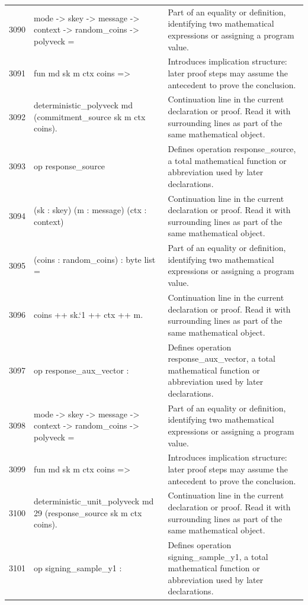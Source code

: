 \documentclass[10pt]{article}
\begin{document}
\begin{longtable}{r L{0.53\textwidth} L{0.37\textwidth}}
3090 & {\ttfamily\scriptsize   mode -> skey -> message -> context -> random\_coins -> polyveck =} & Part of an equality or definition, identifying two mathematical expressions or assigning a program value. \\
3091 & {\ttfamily\scriptsize   fun md sk m ctx coins =>} & Introduces implication structure: later proof steps may assume the antecedent to prove the conclusion. \\
3092 & {\ttfamily\scriptsize     deterministic\_polyveck md (commitment\_source sk m ctx coins).} & Continuation line in the current declaration or proof.  Read it with surrounding lines as part of the same mathematical object. \\
3093 & {\ttfamily\scriptsize op response\_source} & Defines operation response\_source, a total mathematical function or abbreviation used by later declarations. \\
3094 & {\ttfamily\scriptsize    (sk : skey) (m : message) (ctx : context)} & Continuation line in the current declaration or proof.  Read it with surrounding lines as part of the same mathematical object. \\
3095 & {\ttfamily\scriptsize    (coins : random\_coins) : byte list =} & Part of an equality or definition, identifying two mathematical expressions or assigning a program value. \\
3096 & {\ttfamily\scriptsize   coins ++ sk.`1 ++ ctx ++ m.} & Continuation line in the current declaration or proof.  Read it with surrounding lines as part of the same mathematical object. \\
3097 & {\ttfamily\scriptsize op response\_aux\_vector :} & Defines operation response\_aux\_vector, a total mathematical function or abbreviation used by later declarations. \\
3098 & {\ttfamily\scriptsize   mode -> skey -> message -> context -> random\_coins -> polyveck =} & Part of an equality or definition, identifying two mathematical expressions or assigning a program value. \\
3099 & {\ttfamily\scriptsize   fun md sk m ctx coins =>} & Introduces implication structure: later proof steps may assume the antecedent to prove the conclusion. \\
3100 & {\ttfamily\scriptsize     deterministic\_unit\_polyveck md 29 (response\_source sk m ctx coins).} & Continuation line in the current declaration or proof.  Read it with surrounding lines as part of the same mathematical object. \\
3101 & {\ttfamily\scriptsize op signing\_sample\_y1 :} & Defines operation signing\_sample\_y1, a total mathematical function or abbreviation used by later declarations. \\

\end{longtable}
\end{document}
